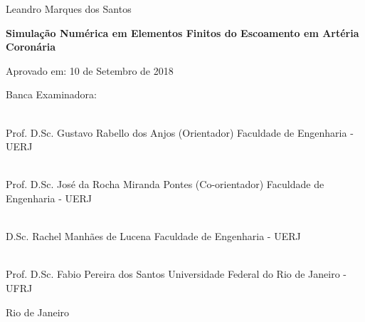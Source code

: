 \addtocounter{page}{+1}
\begin{center}

{\large Leandro Marques dos Santos}

\vspace{1cm}

\textbf{\large Simulação Numérica em Elementos Finitos do Escoamento em Artéria Coronária}

\end{center}

\vspace{.4cm}

\begin{flushright}
\parbox{8cm}{
}
\end{flushright}

\vspace{.6cm}

\noindent Aprovado em: 10 de Setembro de 2018

\noindent Banca Examinadora:

\vspace{.7cm}

\begin{flushright}
\parbox{12cm}{

\singlespacing

\hrulefill \\

\vspace{-.4cm}
Prof. D.Sc. Gustavo Rabello dos Anjos (Orientador)
\newline
Faculdade de Engenharia - UERJ
\vspace{.7cm}

\hrulefill \\

\vspace{-.4cm}
Prof. D.Sc. José da Rocha Miranda Pontes (Co-orientador)
\newline
Faculdade de Engenharia - UERJ
\vspace{.7cm}

\hrulefill \\

\vspace{-.4cm}
D.Sc. Rachel Manhães de Lucena
\newline
Faculdade de Engenharia - UERJ
\vspace{.7cm}

\hrulefill \\

\vspace{-.4cm}
Prof. D.Sc. Fabio Pereira dos Santos
\newline
Universidade Federal do Rio de Janeiro - UFRJ
\vspace{.7cm}

}
\end{flushright}
\vfill

\begin{center}
Rio de Janeiro
\end{center}

